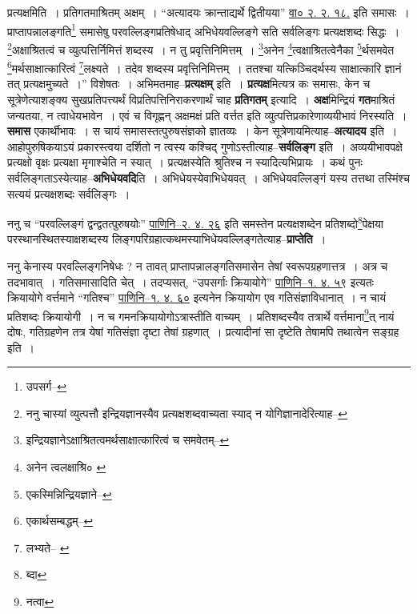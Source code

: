 \documentclass[article,12pt,a4paper]{memoir}
\begin{document}
	प्रत्यक्षमिति । प्रतिगतमाश्रितम् अक्षम् । “अत्यादयः क्रान्ताद्यर्थे द्वितीयया” \href{http://http://sarit.indology.info/?cref=htu.90}{वा० २. २. १८.} इति समासः । प्राप्तापन्नालङ्गति\footnote{उपसर्ग--\cite{dp-msD-n}} समासेषु परवल्लिङ्गप्रतिषेधाद् अभिधेयवल्लिङ्गे सति सर्वलिङ्गः प्रत्यक्षशब्दः सिद्धः । \footnote{ननु चास्यां व्युत्पत्तौ इन्द्रियज्ञानस्यैव प्रत्यक्षशब्दवाच्यता स्याद् न योगिज्ञानादेरित्याह--\cite{dp-msD-n}}\-अक्षाश्रितत्वं च व्युत्पत्तिर्निमित्तं शब्दस्य । न तु प्रवृत्तिनिमित्तम् । \footnote{इन्द्रियज्ञानेऽक्षाश्रितत्वमर्थसाक्षात्कारित्वं च समवेतम्--\cite{dp-msD-n}}\-अनेन \footnote{अनेन त्वलक्षाश्रि० \cite{dp-msA}}\-त्वक्षाश्रितत्वेनैका \footnote{एकस्मिन्निन्द्रियज्ञाने--\cite{dp-msD-n}}\-र्थसमवेत \footnote{एकार्थसम्बद्धम्--\cite{dp-msD-n}}\-मर्थसाक्षात्कारित्वं \footnote{लभ्यते--\cite{dp-msB} \cite{dp-edN}}\-लक्ष्यते । तदेव शब्दस्य प्रवृत्तिनिमित्तम् । ततश्चा यत्किञ्चिदर्थस्य साक्षात्कारि ज्ञानं तत् प्रत्यक्षमुच्यते ।” विशेषतः । अभिमतमाह--\textbf{प्रत्यक्षम्} इति । \textbf{प्रत्यक्ष}मित्यत्र कः समासः, केन च सूत्रेणेत्याशङ्क्य सुखप्रतिपत्त्यर्थं विप्रतिपत्तिनिराकरणार्थं चाह \textbf{प्रतिगतम्} इत्यादि । \textbf{अक्ष}मिन्द्रियं \textbf{गत}माश्रितं जन्यतया, न त्वाधेयभावेन । एवं च विगृह्णन् अक्षमक्षं प्रति वर्त्तत इति व्युत्पत्तिप्रकारेणाव्ययीभावं निरस्यति । \textbf{समास} एकार्थीभावः । स चायं समासस्तत्पुरुषसंज्ञको ज्ञातव्यः । केन सूत्रेणायमित्याह--\textbf{अत्यादय} इति । आहोपुरुषिकयाऽयं प्रकारस्त्वया दर्शितो न त्वस्य कश्चिद् गुणोऽस्तीत्याह--\textbf{सर्वलिङ्ग} इति । अव्ययीभावपक्षे प्रत्यक्षो वृक्षः प्रत्यक्षा मृगाश्चेति न स्यात् । प्रत्यक्षस्येति श्रुतिश्च न स्यादित्यभिप्रायः । कथं पुनः सर्वलिङ्गताऽस्येत्याह--\textbf{अभिधेयवदि}ति । अभिधेयस्येवाभिधेयवत् । अभिधेयवल्लिङ्गं यस्य तत्तथा तस्मिंश्च सत्ययं प्रत्यक्षशब्दः सर्वलिङ्गः ।
	\pend
      

	  \pstart ननु च “परवल्लिङ्गं द्वन्द्वतत्पुरुषयोः” \href{http://http://sarit.indology.info/?cref=Pā.2.4.26}{पाणिनि--२. ४. २६} इति समस्तेन प्रत्यक्षशब्देन प्रतिशब्दो\footnote{ब्दा}\-पेक्षया परस्थानस्थितस्याक्षशब्दस्य लिङ्गपरिग्रहात्कथमस्याभिधेयवल्लिङ्गतेत्याह--\textbf{प्राप्तेति} ।
	\pend
      

	  \pstart ननु केनास्य परवल्लिङ्गनिषेधः ? न तावत् प्राप्तापन्नालङ्गतिसमासेन तेषां स्वरूपग्रहणात्तत्र । अत्र च तदभावात् । गतिसमासादिति चेत् । तदप्यसत्, “उपसर्गाः क्रियायोगे” \href{http://http://sarit.indology.info/?cref=Pā.1.4.59}{पाणिनि--१. ४. ५९} इत्यतः क्रियायोगे वर्त्तमाने “गतिश्च” \href{http://http://sarit.indology.info/?cref=Pā.1.4.60}{पाणिनि--१. ४. ६०} इत्यनेन क्रियायोग एव गतिसंज्ञाविधानात् । न चायं प्रतिशब्दः क्रियायोगी । न च गमनक्रियायोगोऽत्रास्तीति वाच्यम् । प्रतिशब्दस्यैव तत्रार्थे वर्त्तमाना\footnote{नत्वा}\-त् नायं दोषः, गतिग्रहणेन तत्र येषां गतिसंज्ञा दृष्टा तेषां ग्रहणात् । प्रत्यादीनां सा दृष्टेति तेषामपि तथात्वेन सङ्ग्रह इति ।
	\pend
      
\end{document}
